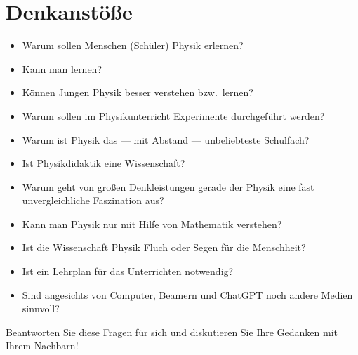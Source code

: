 \chapter{Denkanstöße}\label{Denk}

\begin{itemize}
\item
Warum sollen Menschen (Sch\"{u}ler) Physik erlernen?
\item
Kann man  lernen?
\item
K\"{o}nnen Jungen Physik besser verstehen bzw.\ lernen?
\item
Warum sollen im Physikunterricht Experimente durchgef\"{u}hrt werden?
\item
Warum ist Physik das --- mit Abstand --- unbeliebteste Schulfach?
\item
Ist Physikdidaktik eine Wissenschaft?
\item
Warum geht von gro{\ss}en Denkleistungen gerade der Physik eine fast unvergleichliche Faszination aus?
\item
Kann man Physik nur mit Hilfe von Mathematik verstehen?
\item
Ist die Wissenschaft Physik Fluch oder Segen f\"{u}r die Menschheit?
\item
Ist ein Lehrplan f\"{u}r das Unterrichten notwendig?
\item
Sind angesichts von Computer, Beamern und ChatGPT  noch andere Medien sinnvoll?
\end{itemize}

\begin{uea}
	Beantworten Sie diese Fragen für sich und diskutieren Sie Ihre Gedanken mit Ihrem Nachbarn!
\end{uea}